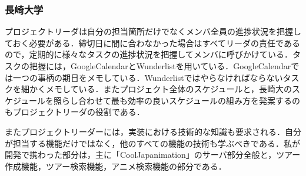 \subsubsection{長崎大学}
\par プロジェクトリーダは自分の担当箇所だけでなくメンバ全員の進捗状況を把握しておく必要がある．締切日に間に合わなかった場合はすべてリーダの責任であるので，定期的に様々なタスクの進捗状況を把握してメンバに呼びかけている．タスクの把握には，GoogleCalendarとWunderlistを用いている．GoogleCalendarでは一つの事柄の期日をメモしている．Wunderlistではやらなければならないタスクを細かくメモしている．またプロジェクト全体のスケジュールと，長崎大のスケジュールを照らし合わせて最も効率の良いスケジュールの組み方を発案するのもプロジェクトリーダの役割である．
\par またプロジェクトリーダーには，実装における技術的な知識も要求される．自分が担当する機能だけではなく，他のすべての機能の技術も学ぶべきである．私が開発で携わった部分は，主に「CoolJapanimation」のサーバ部分全般と，ツアー作成機能，ツアー検索機能，アニメ検索機能の部分である．
